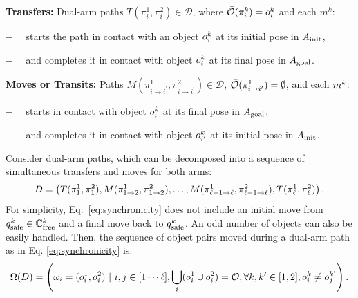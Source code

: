 \noindent\textbf{Transfers:} Dual-arm paths $T(\pi^1_i,\pi^2_i) \in \mathcal{D}$, where $ \bar{\mathcal{O}}(\pi^k_i) =  o^k_i $ and each $m^k$:
\begin{myitem}
\item[$-$]\ \ starts the path in contact with an object $o^k_i$ at its initial pose in $A_{\rm init}$,
\item[$-$]\ \ and completes it in contact with object $ o^k_i $ at its final pose in $A_{\rm goal}$. 
\end{myitem}

\noindent\textbf{Moves or Transits:} Paths $M(\pi^1_{i\rightarrow i^{\prime}},\pi^2_{i\rightarrow i^{\prime}}) \in \mathcal{D}$, $ \bar{\mathcal{O}}(\pi^1_{i\rightarrow i^{\prime}}) = \emptyset $, and each $m^k$:
\begin{myitem}
\item[$-$]\ \  starts in contact with object $o^k_i$ at its final pose in $A_{\rm goal}$,
\item[$-$]\ \  and completes it in contact with object $o^k_{i^{\prime}}$ at its initial pose in $A_{\rm init}$.
\end{myitem}

\vspace{-.1in}
{\assumption [Synchronicity] Consider dual-arm paths, which can be decomposed into a sequence of simultaneous transfers and moves for both arms:
\vspace{-.1in}
\begin{equation}
D=\left(T(\pi^1_1,\pi^2_1),M(\pi^1_{1\rightarrow 2},\pi^2_{1\rightarrow 2}), \ldots , M(\pi^1_{\ell-1\rightarrow \ell},\pi^2_{\ell-1\rightarrow \ell}), T(\pi^1_\ell,\pi^2_\ell)\right).\vspace{-.05in}
\label{eq:synchronicity}
\end{equation}}
\noindent For simplicity, Eq.~\ref{eq:synchronicity} does not include an initial move from $q^k_{\rm safe} \in \mathbb{C}_{{\rm free}}^k$ and a final move back to $q^k_{\rm safe}$. An odd number of objects can also be easily handled. Then, the sequence of object pairs moved during a dual-arm path as in Eq. \ref{eq:synchronicity} is: \vspace{-.1in} 
$$ \scoma(D) = \left(  \coma_i = (\object_i^1,\object_i^2) \ |\ i,j\in [1\cdots \ell], \bigcup_i (\object_i^1 \cup \object_i^2) = \objectset, \forall k,k'\in[1,2], \object_i^k \neq \object_j^{k'} \right). \vspace{-.1in}$$

